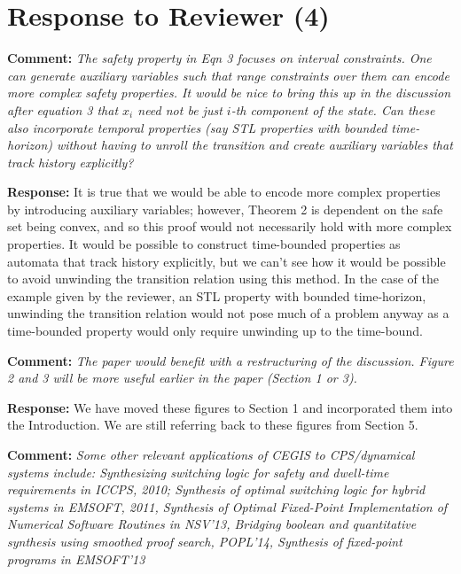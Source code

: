 \documentclass{article}
\begin{document}
\section{Response to Reviewer (4)}

{\bf Comment:  } {\itshape The safety property in Eqn 3 focuses on interval constraints. One can generate auxiliary variables such that range
constraints over them can encode
more complex safety properties. It would be nice to bring this up in the discussion after equation 3 that $x_i$ need not be just $i$-th component of
the
state.  Can these also incorporate temporal properties (say STL properties with bounded time-horizon) without having to unroll the transition and
create auxiliary variables that track history explicitly?}

\vspace{1em}
{\bf Response:}
 It is true that we would be able to encode more complex properties by introducing auxiliary variables; 
 however,  Theorem 2 is dependent on the safe set being convex, and so this proof would not necessarily hold with more complex properties. 
 It would be possible to construct time-bounded properties as automata that track history explicitly, but we can't see how
it would be possible to avoid unwinding the transition relation using this method. In the case of the example given by the reviewer, an STL property with bounded time-horizon, unwinding
the transition relation would not pose much of a problem anyway as a time-bounded property would only require unwinding up to the time-bound.


\vspace{2em}
{\bf Comment: } {\itshape The paper would benefit with a restructuring of the discussion. Figure 2 and 3 will be more useful
earlier in the paper (Section 1 or 3).}

\vspace{1em}
{\bf Response: }
We have moved these figures to Section 1 and incorporated them into the Introduction. We are still referring back to these figures from Section 5.

\vspace{2em}

{\bf Comment: } {\itshape
Some other relevant applications of CEGIS to CPS/dynamical systems include: Synthesizing switching logic for
safety and dwell-time requirements in ICCPS, 2010; Synthesis of optimal switching logic for hybrid systems in EMSOFT, 2011, Synthesis of Optimal
Fixed-Point Implementation of Numerical Software Routines in NSV'13, Bridging boolean and quantitative synthesis using smoothed proof search,
POPL'14, Synthesis of fixed-point programs in EMSOFT'13}
\end{document}
